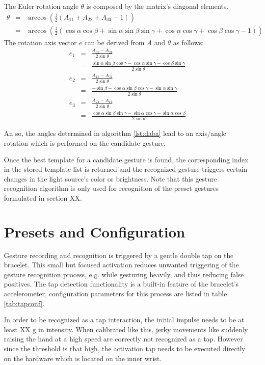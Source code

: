 The Euler rotation angle $ \theta $ is composed by the matrix's diagonal elements.
\begin{eqnarray*}
\theta & = & \arccos(\frac{1}{2}(A_{11} + A_{22} + A_{33} - 1)) \\
       & = & \arccos(\frac{1}{2}(\cos\alpha\cos\beta+\sin\alpha\sin\beta\sin\gamma+\cos\alpha\cos\gamma+\cos\beta\cos\gamma-1))
\end{eqnarray*}
The rotation axis vector $ e $ can be derived from $ A $ and $ \theta $ as follows:
\begin{eqnarray*}
e_1 & = &  \frac{A_{32} - A_{23}}{2\sin\theta} \\
    & = & \frac{\sin\alpha\sin\beta\cos\gamma-\cos\alpha\sin\gamma-\cos\beta\sin\gamma}{2\sin\theta} \\
e_2 & = & \frac{A_{13} - A_{31}}{2\sin\theta} \\
    & = & \frac{-\sin\beta-\cos\alpha\sin\beta\cos\gamma-\sin\alpha\sin\gamma}{2\sin\theta} \\
e_3 & = & \frac{A_{21} - A_{12}}{2\sin\theta} \\
    & = & \frac{\cos\alpha\sin\beta\sin\gamma-\sin\alpha\cos\gamma-\sin\alpha\cos\beta}{2\sin\theta}
\end{eqnarray*}

An so, the angles determined in algorithm \ref{lst:daba} lead to an axis/angle rotation which is performed on the candidate gesture.

Once the best template for a candidate gesture is found, the corresponding index in the stored template list is returned and the recognized gesture triggers certain changes in the light source's color or brightness. Note that this gesture recognition algorithm is only used for recognition of the preset gestures formulated in section XX. %


\section{Presets and Configuration}

Gesture recording and recognition is triggered by a gentle double tap on the bracelet. This small but focused activation reduces unwanted triggering of the gesture recognition process, e.g. while gesturing heavily, and thus reducing false positives. The tap detection functionality is a built-in feature of the bracelet's accelerometer, configuration parameters for this process are listed in table \ref{tab:tapconf}.

In order to be recognized as a tap interaction, the initial impulse needs to be at least XX g in intensity. When calibrated like this, jerky movements like suddenly raising the hand at a high speed are correctly not recognized as a tap. However since the threshold is that high, the activation tap needs to be executed directly on the hardware which is located on the inner wrist.


